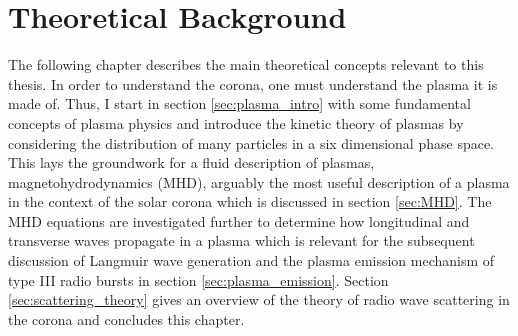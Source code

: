 \doublespacing
\chapter{Theoretical Background}
\label{chap:theory}
The following chapter describes the main theoretical concepts relevant to this thesis. In order to understand the corona, one must understand the plasma it is made of. Thus, I start in section \ref{sec:plasma_intro} with some fundamental concepts of plasma physics and introduce the kinetic theory of plasmas by considering the distribution of many particles in a six dimensional phase space. This lays the groundwork for a fluid description of plasmas, magnetohydrodynamics (MHD), arguably the most useful description of a plasma in the context of the solar corona which is discussed in section \ref{sec:MHD}. The MHD equations are investigated further to determine how longitudinal and transverse waves propagate in a plasma which is relevant for the subsequent discussion of Langmuir wave generation and the plasma emission mechanism of type III radio bursts in section \ref{sec:plasma_emission}. Section \ref{sec:scattering_theory} gives an overview of the theory of radio wave scattering in the corona and concludes this chapter. 


